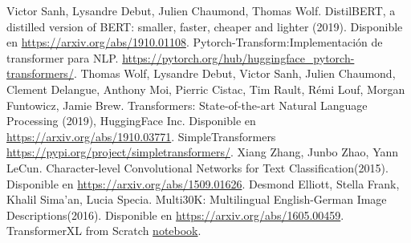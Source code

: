 \documentclass[conference]{IEEEtran}
\begin{document}
\begin{thebibliography}{00}
Victor Sanh, Lysandre Debut, Julien Chaumond, Thomas Wolf. DistilBERT, a distilled version of BERT: smaller, faster, cheaper and lighter (2019). Disponible en \href{https://arxiv.org/abs/1910.01108}{https://arxiv.org/abs/1910.01108}.
Pytorch-Transform:Implementaci\'on de transformer para NLP. \href{https://pytorch.org/hub/huggingface\_pytorch-transformers/}{https://pytorch.org/hub/huggingface\_pytorch-transformers/}.
Thomas Wolf, Lysandre Debut, Victor Sanh, Julien Chaumond,
Clement Delangue, Anthony Moi, Pierric Cistac, Tim Rault,
R\'emi Louf, Morgan Funtowicz, Jamie Brew. Transformers: State-of-the-art Natural
Language Processing (2019), HuggingFace Inc. Disponible en \href{https://arxiv.org/abs/1910.03771}{https://arxiv.org/abs/1910.03771}.
SimpleTransformers \href{https://pypi.org/project/simpletransformers/}{https://pypi.org/project/simpletransformers/}.
 Xiang Zhang, Junbo Zhao, Yann LeCun. 
Character-level Convolutional Networks for Text Classification(2015). Disponible en \href{https://arxiv.org/abs/1509.01626}{https://arxiv.org/abs/1509.01626}. 
 Desmond Elliott, Stella Frank, Khalil Sima'an, Lucia Specia. 
Multi30K: Multilingual English-German Image Descriptions(2016). Disponible en \href{https://arxiv.org/abs/1605.00459}{https://arxiv.org/abs/1605.00459}. 
TransformerXL from Scratch \href{https://github.com/keitakurita/Practical_NLP_in_PyTorch/blob/master/deep_dives/transformer_xl_from_scratch.ipynb}{notebook}.
\end{thebibliography}
\end{document}
